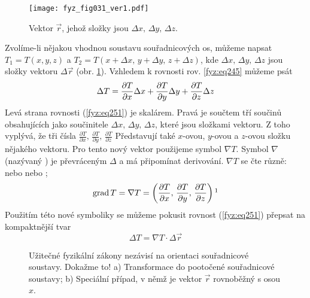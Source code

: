     \begin{figure}[ht!]  %
      \centering
      \texttt{[image: fyz\_fig031\_ver1.pdf]}
      \caption{Vektor $\vec{r}$, jehož složky jsou $\Delta x,\,\Delta y,\,\Delta z$.}
      \label{fyz:fig031}
    \end{figure}
    Zvolíme-li nějakou vhodnou soustavu souřadnicových os, můžeme napsat $T_1=T(x,y,z)$ a 
    $T_2=T(x+\Delta x,\,y+\Delta y,\,z+\Delta z)$, kde $\Delta x,\,\Delta y,\,\Delta z$ jsou složky 
    vektoru $\Delta \vec{r}$ (obr. \ref{fyz:fig031}). Vzhledem k rovnosti rov. 
    \ref{fyz:eq245} můžeme psát    
    \begin{equation}\label{fyz:eq251}
      \Delta T = \dfrac{\partial T}{\partial x}\Delta x + \dfrac{\partial T}{\partial y}\Delta y + \dfrac{\partial T}{\partial z}\Delta z
    \end{equation}
    Levá strana rovnosti (\ref{fyz:eq251}) je skalárem. Pravá je součtem tří součinů obsahujících 
    jako součinitele $\Delta x,\,\Delta y,\,\Delta z$, které jsou složkami vektoru. Z toho vyplývá, 
    že tři čísla \(\frac{\partial T}{\partial x},\,\frac{\partial T}{\partial y},\,\frac{\partial 
    T}{\partial z}\) Představují také \(x\)-ovou, \(y\)-ovou a \(z\)-ovou složku nějakého vektoru. 
    Pro tento nový vektor použijeme symbol \(\nabla T\). Symbol \(\nabla\) (nazývaný ) je 
    převráceným \(\Delta\) a má připomínat derivování. \(\nabla T\) se čte různě: \emph{} nebo \emph{} nebo \emph{};
    \begin{equation}\label{fyz:eq252}
      \mathrm{grad}\,T =\nabla T = \left(\pder{T}{x},\, \pder{T}{y},\,\pder{T}{z} \right)
      \footnotemark
    \end{equation}
    Použitím této nové symboliky se můžeme pokusit rovnost (\ref{fyz:eq251}) 
    přepsat na kompaktnější tvar
    \begin{equation}\label{fyz:eq257}
      \Delta T = \nabla T \cdot\Delta\vec{r}
    \end{equation}        

    \begin{figure}[ht!]
      \centering
      \caption{Užitečné fyzikální zákony nezávisí na orientaci souřadnicové soustavy. Dokažme to!
               a) Transformace do pootočené souřadnicové soustavy; b) Speciální případ, v němž je 
               vektor \(\vec{r}\) rovnoběžný s osou \(x\).
               \cite[s.~33]{Feynman02}}
      \label{fyz:fig154}
    \end{figure}

